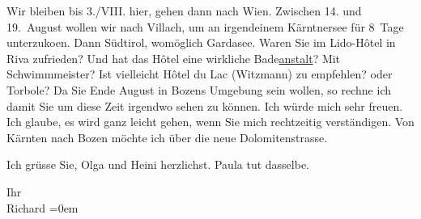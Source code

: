 \pstart
           Wir bleiben bis 3./VIII. hier, gehen dann nach Wien. Zwischen 14. und 19. August
               wollen wir {\pb}nach Villach, um an irgendeinem Kärntnersee für 8 Tage unterzuko{\geminationm}en. Dann Südtirol, womöglich Gardasee. Waren Sie im Lido-Hôtel in Riva
               zufrieden? Und hat das Hôtel eine wirkliche Bade\uline{anstalt}? Mit Schwimmmeister? Ist vielleicht Hôtel du Lac (Witzmann) zu empfehlen? oder Torbole? Da Sie Ende August in Bozens Umgebung sein wollen, so rechne ich damit Sie um diese Zeit irgendwo
               sehen zu können. Ich würde {\pb}mich
               sehr freuen. Ich glaube, es wird ganz leicht gehen, wenn Sie mich rechtzeitig
               verständigen. Von Kärnten nach Bozen möchte ich über die neue Dolomitenstrasse.\pend
           
\pstart
           Ich grüsse Sie, Olga und Heini herzlichst. Paula
               tut dasselbe.\pend
           
\pstart
           Ihr{\\[\baselineskip]}\spacefill\mbox{Richard}\pend
           \leftskip=0em{}\endnumbering{}  \newcommand{\dateiname}{L01694}\newcommand{\titel}{Richard Beer-Hofmann an Arthur Schnitzler, 26. 7. 1907}\newcommand{\editorInnen}{Martin Anton Müller und Gerd-Hermann Susen}
